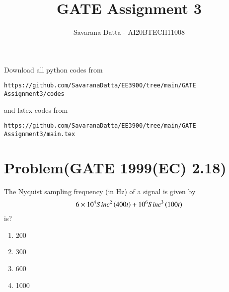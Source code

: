 \documentclass[journal,12pt,twocolumn]{IEEEtran}
\begin{document}
     \def\rightbox#1{\makebox[0in][r]{#1}}
     \def\centbox#1{\makebox[0in]{#1}}
     \def\topbox#1{\raisebox{-\baselineskip}[0in][0in]{#1}}
     \def\midbox#1{\raisebox{-0.5\baselineskip}[0in][0in]{#1}}
\vspace{3cm}
\title{ GATE Assignment 3}
\author{Savarana Datta - AI20BTECH11008}
\maketitle
\newpage
\bigskip
\renewcommand{\thefigure}{\theenumi}
\renewcommand{\thetable}{\theenumi}
Download all python codes from 
\begin{lstlisting}
https://github.com/SavaranaDatta/EE3900/tree/main/GATE Assignment3/codes
\end{lstlisting}
%
and latex codes from 
%
\begin{lstlisting}
https://github.com/SavaranaDatta/EE3900/tree/main/GATE Assignment3/main.tex
\end{lstlisting}

\section{Problem(GATE 1999(EC) 2.18)}
The Nyquist sampling frequency (in Hz) of a signal is given by 
\begin{align}
    6\times 10^{4} Sinc^{2}\left(400t\right)+10^{6} Sinc^{3}\left(100t\right) 
\end{align}is?
\begin{enumerate}
    \item 200
    \item 300
    \item 600
    \item 1000
\end{enumerate}
\end{document}
